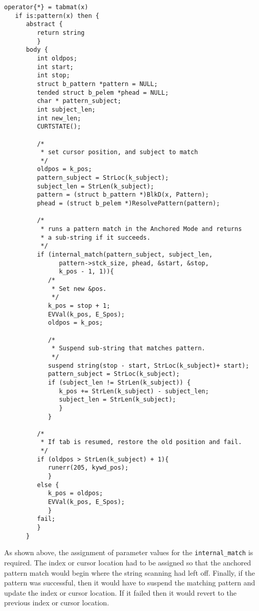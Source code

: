 \documentclass{article}
\begin{document}
\begin{verbatim}
operator{*} = tabmat(x)
   if is:pattern(x) then {
      abstract {
         return string
         }
      body {
         int oldpos;
         int start;
         int stop;
         struct b_pattern *pattern = NULL;
         tended struct b_pelem *phead = NULL; 
         char * pattern_subject;
         int subject_len;
         int new_len;
         CURTSTATE();
         
         /*
          * set cursor position, and subject to match
          */
         oldpos = k_pos;
         pattern_subject = StrLoc(k_subject);
         subject_len = StrLen(k_subject);
         pattern = (struct b_pattern *)BlkD(x, Pattern);
         phead = (struct b_pelem *)ResolvePattern(pattern);
         
         /*
          * runs a pattern match in the Anchored Mode and returns
          * a sub-string if it succeeds.
          */
         if (internal_match(pattern_subject, subject_len, 
               pattern->stck_size, phead, &start, &stop, 
               k_pos - 1, 1)){
            /*
             * Set new &pos.
             */ 
            k_pos = stop + 1;
            EVVal(k_pos, E_Spos);	
            oldpos = k_pos;
         
            /*
             * Suspend sub-string that matches pattern.
             */
            suspend string(stop - start, StrLoc(k_subject)+ start);
            pattern_subject = StrLoc(k_subject);
            if (subject_len != StrLen(k_subject)) {
               k_pos += StrLen(k_subject) - subject_len;
               subject_len = StrLen(k_subject);
               }
            }
            
         /*
          * If tab is resumed, restore the old position and fail.
          */
         if (oldpos > StrLen(k_subject) + 1){
            runerr(205, kywd_pos);
            } 
         else {
            k_pos = oldpos;
            EVVal(k_pos, E_Spos);
            }
         fail;
         }
      }
\end{verbatim}

As shown above, the assignment of parameter values for the \texttt{internal\_match} is required. The index or cursor location had to be assigned so that the anchored pattern match would begin where the string scanning had left off.  Finally, if the pattern was successful, then it would have to suspend the matching pattern and update the index or cursor location.  If it failed then it would revert to the previous index or cursor location.  
\end{document}
